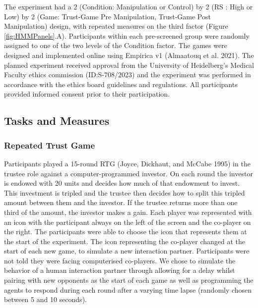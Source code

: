 \documentclass[
]{article}
\begin{document}
The experiment had a 2 (Condition: Manipulation or Control) by 2 (RS : High or Low) by 2 (Game: Trust-Game Pre Manipulation, Trust-Game Post Manipulation) design, with repeated measures on the third factor (Figure \ref{fig:HMMPanels}.A). Participants within each pre-screened group were randomly assigned to one of the two levels of the Condition factor. The games were designed and implemented online using Empirica v1 (Almaatouq et al. 2021). The planned experiment received approval from the University of Heidelberg's Medical Faculty ethics commission (ID:S-708/2023) and the experiment was performed in accordance with the ethics board guidelines and regulations. All participants provided informed consent prior to their participation.

\subsection{Tasks and Measures}\label{tasks-and-measures}

\subsubsection{Repeated Trust Game}\label{repeated-trust-game}

Participants played a 15-round RTG (Joyce, Dickhaut, and McCabe 1995) in the trustee role against a computer-programmed investor. On each round the investor is endowed with 20 units and decides how much of that endowment to invest. This investment is tripled and the trustee then decides how to split this tripled amount between them and the investor. If the trustee returns more than one third of the amount, the investor makes a gain. Each player was represented with an icon with the participant always on the left of the screen and the co-player on the right. The participants were able to choose the icon that represents them at the start of the experiment. The icon representing the co-player changed at the start of each new game, to simulate a new interaction partner. Participants were not told they were facing computerised co-players. We chose to simulate the behavior of a human interaction partner through allowing for a delay whilst pairing with new opponents as the start of each game as well as programming the agents to respond during each round after a varying time lapse (randomly chosen between 5 and 10 seconds).
\end{document}
